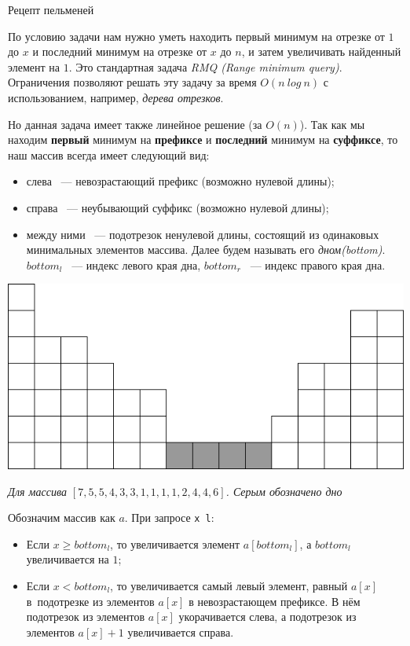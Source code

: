 \begin{tutorial}{Рецепт пельменей}

По условию задачи нам нужно уметь находить первый минимум на отрезке от $1$ до $x$ и последний минимум на отрезке от $x$ до $n$, и затем увеличивать найденный элемент на $1$. Это стандартная задача \textit{RMQ (Range minimum query)}. Ограничения позволяют решать эту задачу за время $O(n~log~n)$ с использованием, например, \textit{дерева отрезков}.

Но данная задача имеет также линейное решение (за $O(n)$). Так как мы находим \textbf{первый} минимум на \textbf{префиксе} и \textbf{последний} минимум на \textbf{суффиксе}, то наш массив всегда имеет следующий вид:
\begin{itemize}
  \item слева ~--- невозрастающий префикс (возможно нулевой длины);
  \item справа ~--- неубывающий суффикс (возможно нулевой длины);
  \item между ними ~--- подотрезок ненулевой длины, состоящий из одинаковых минимальных элементов массива. Далее будем называть его \textit{дном(bottom)}. $bottom_l$ ~--- индекс левого края дна, $bottom_r$ ~--- индекс правого края дна.
\end{itemize}

\begin{center}
  \includegraphics [scale = 0.8] {1.png}

  \textit{Для массива $[7, 5, 5, 4, 3, 3, 1, 1, 1, 1, 2, 4, 4, 6]$. Серым обозначено дно}
\end{center}

Обозначим массив как $a$. При запросе \texttt{x l}:
\begin{itemize}
  \item Если $x \ge bottom_l$, то увеличивается элемент $a[bottom_l]$, а $bottom_l$ увеличивается на $1$;
  \item Если $x < bottom_l$, то увеличивается самый левый элемент, равный $a[x]$ в~подотрезке из элементов $a[x]$ в невозрастающем префиксе. В нём подотрезок из элементов $a[x]$ укорачивается слева, а подотрезок из элементов $a[x] + 1$ увеличивается справа.
\end{itemize}


\end{tutorial}
